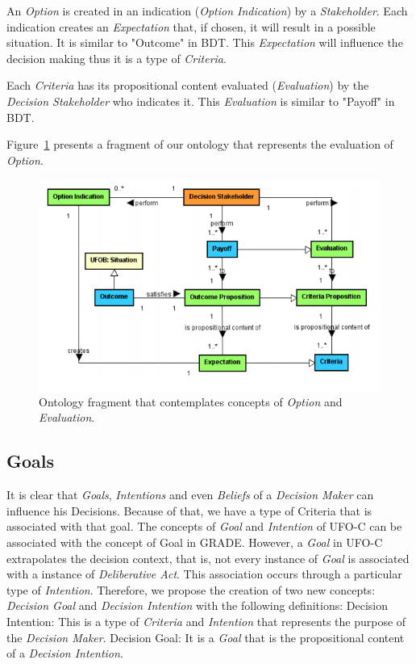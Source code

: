 An \textit{Option} is created in an indication (\textit{Option Indication}) by a \textit{Stakeholder}. Each indication creates an \textit{Expectation} that, if chosen, it will result in a possible situation. It is similar to "Outcome" in BDT. This \textit{Expectation} will influence the decision making thus it is a type of \textit{Criteria}.

Each \textit{Criteria} has its propositional content evaluated (\textit{Evaluation}) by the \textit{Decision Stakeholder} who indicates it. This \textit{Evaluation} is similar to "Payoff" in BDT.

Figure~\ref{fig-evaluate-indication} presents a fragment of our ontology that represents the evaluation of \textit{Option}.


\begin{figure}
	\centering
	\includegraphics[width=\textwidth]{figuras/fig-evaluate-indication} 
	\caption{Ontology fragment that contemplates concepts of \textit{Option} and \textit{Evaluation}.}
	\label{fig-evaluate-indication}
\end{figure}

\subsection{Goals}

It is clear that \textit{Goals}, \textit{Intentions} and even \textit{Beliefs} of a \textit{Decision Maker} can influence his Decisions. Because of that, we have a type of Criteria that is associated with that goal. The concepts of \textit{Goal} and \textit{Intention} of UFO-C can be associated with the concept of Goal in GRADE. However, a \textit{Goal} in UFO-C extrapolates the decision context, that is, not every instance of \textit{Goal} is associated with a instance of \textit{Deliberative Act}. This association occurs through a particular type of \textit{Intention}. Therefore, we propose the creation of two new concepts: \textit{Decision Goal} and \textit{Decision Intention} with the following definitions:
Decision Intention: This is a type of \textit{Criteria} and \textit{Intention} that represents the purpose of the \textit{Decision Maker}.
Decision Goal: It is a \textit{Goal} that is the propositional content of a \textit{Decision Intention}.


